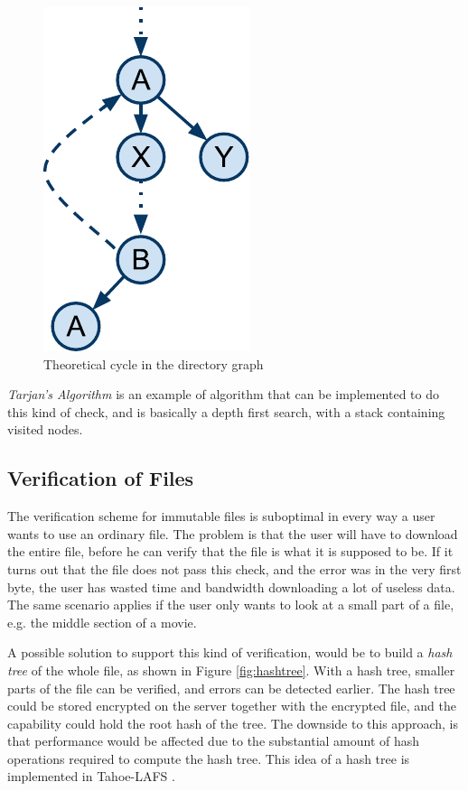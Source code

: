 \documentclass[pdftex,english,10pt,b5paper,twoside]{book}
\begin{document}
\begin{figure}[h!]
    \centering
    \includegraphics[scale=0.6]{CyclesintheDAG.pdf}
    \caption{Theoretical cycle in the directory graph}
    \label{fig:DSC:cycles}
\end{figure}

\emph{Tarjan's Algorithm} \cite{tarjan} is an example of algorithm that can be
implemented to do this kind of check, and is basically a depth first search,
with a stack containing visited nodes.

\subsection{Verification of Files}

The verification scheme for immutable files is suboptimal in every way a user
wants to use an ordinary file. The problem is that the user will have to
download the entire file, before he can verify that the file is what it is
supposed to be. If it turns out that the file does not pass this check, and the
error was in the very first byte, the user has wasted time and bandwidth
downloading a lot of useless data. The same scenario applies if the user only
wants to look at a small part of a file, e.g. the middle section of a movie.

A possible solution to support this kind of verification, would be to build a
\emph{hash tree} of the whole file, as shown in Figure \ref{fig:hashtree}. With
a hash tree, smaller parts of the file can be verified, and errors can be
detected earlier. The hash tree could be stored encrypted on the server
together with the encrypted file, and the capability could hold the root hash
of the tree. The downside to this approach, is that performance would be
affected due to the substantial amount of hash operations required to compute
the hash tree.  This idea of a hash tree is implemented in Tahoe-\ac{LAFS}
\cite{tahoe}.
\end{document}
